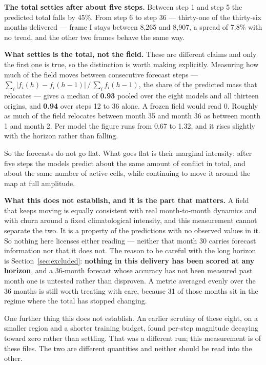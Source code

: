 \noindent \textbf{The total settles after about five steps.} Between step 1 and step 5 the
predicted total falls by 45\%. From step 6 to step 36 --- thirty-one of the thirty-six months
delivered --- frame I stays between 8,265 and 8,907, a spread of 7.8\% with no trend, and the other
two frames behave the same way.

\textbf{What settles is the total, not the field.} These are different claims and only the first
one is true, so the distinction is worth making explicitly. Measuring how much of the field moves
between consecutive forecast steps ---
$\sum_i |f_i(h) - f_i(h-1)| \,/\, \sum_i f_i(h-1)$, the share of the predicted mass that
relocates --- gives a median of \textbf{0.93} pooled over the eight models and all thirteen
origins, and \textbf{0.94} over steps 12 to 36 alone. A frozen field would read 0. Roughly as much
of the field relocates between month 35 and month 36 as between month 1 and month 2. Per model the
figure runs from 0.67 to 1.32, and it rises slightly with the horizon rather than falling.

So the forecasts do not go flat. What goes flat is their marginal intensity: after five steps the
models predict about the same amount of conflict in total, and about the same number of active
cells, while continuing to move it around the map at full amplitude.

\textbf{What this does not establish, and it is the part that matters.} A field that keeps moving
is equally consistent with real month-to-month dynamics and with churn around a fixed
climatological intensity, and this measurement cannot separate the two. It is a property of the
predictions with no observed values in it. So nothing here licenses either reading --- neither that
month 30 carries forecast information nor that it does not. The reason to be careful with the long
horizon is Section~\ref{sec:excluded}: \textbf{nothing in this delivery has been scored at any
horizon}, and a 36-month forecast whose accuracy has not been measured past month one is untested
rather than disproven. A metric averaged evenly over the 36 months is still worth treating with
care, because 31 of those months sit in the regime where the total has stopped changing.

One further thing this does not establish. An earlier scrutiny of these eight, on a smaller region
and a shorter training budget, found per-step magnitude decaying toward zero rather than settling.
That was a different run; this measurement is of these files. The two are different quantities and
neither should be read into the other.
